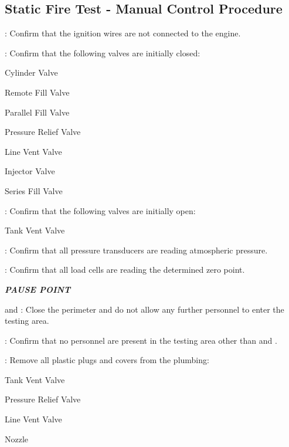 \newpage
    
\subsection{Static Fire Test - Manual Control Procedure}
\begin{checklist}
    \item \secondary: Confirm that the ignition wires are not connected to the engine.
    \item \primary{}: Confirm that the following valves are initially closed:
    \begin{checklist}
        \item Cylinder Valve
        \item Remote Fill Valve
        \item Parallel Fill Valve
        \item Pressure Relief Valve
        \item Line Vent Valve
        \item Injector Valve
        \item Series Fill Valve
    \end{checklist}
    \item \primary{}: Confirm that the following valves are initially open:
    \begin{checklist}
        \item Tank Vent Valve
    \end{checklist}
    \item \daq{}: Confirm that all pressure transducers are reading atmospheric pressure.
    \item \daq{}: Confirm that all load cells are reading the determined zero point.
    \item \textbf{\textit{PAUSE POINT}}
    \item \peri{} and \perii{}: Close the perimeter and do not allow any further personnel to enter the testing area.
    \item \secondary: Confirm that no personnel are present in the testing area other than \primary{} and \secondary.
    \item \primary: Remove all plastic plugs and covers from the plumbing:
    \begin {checklist}
        \item Tank Vent Valve
        \item Pressure Relief Valve
        \item Line Vent Valve
        \item Nozzle

\end{checklist}
\end{checklist}
